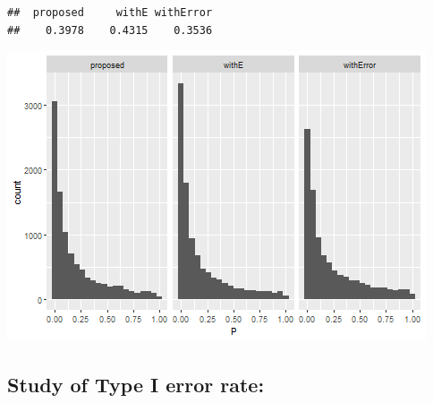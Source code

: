 \documentclass[
]{article}
\newenvironment{Shaded}{\begin{snugshade}}{\end{snugshade}}
\newcommand{\DataTypeTok}[1]{\textcolor[rgb]{0.13,0.29,0.53}{#1}}
\newcommand{\DecValTok}[1]{\textcolor[rgb]{0.00,0.00,0.81}{#1}}
\newcommand{\KeywordTok}[1]{\textcolor[rgb]{0.13,0.29,0.53}{\textbf{#1}}}
\newcommand{\NormalTok}[1]{#1}
\newcommand{\OperatorTok}[1]{\textcolor[rgb]{0.81,0.36,0.00}{\textbf{#1}}}
\newcommand{\StringTok}[1]{\textcolor[rgb]{0.31,0.60,0.02}{#1}}
\begin{document}
\begin{verbatim}
##  proposed     withE withError 
##    0.3978    0.4315    0.3536
\end{verbatim}

\begin{Shaded}
\end{Shaded}

\includegraphics{simulation_bootstrapping_files/figure-latex/unnamed-chunk-3-1.png}

\hypertarget{study-of-type-i-error-rate}{%
\subsection{Study of Type I error
rate:}\label{study-of-type-i-error-rate}}
\end{document}
